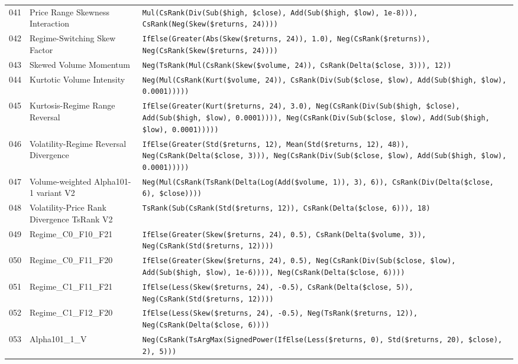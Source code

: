 \begin{longtable}{@{}llp{}@{}}
041 & Price Range Skewness Interaction & \texttt{Mul(CsRank(Div(Sub(\$high, \$close), Add(Sub(\$high, \$low), 1e-8))), CsRank(Neg(Skew(\$returns, 24))))} \\
042 & Regime-Switching Skew Factor & \texttt{IfElse(Greater(Abs(Skew(\$returns, 24)), 1.0), Neg(CsRank(\$returns)), Neg(CsRank(Skew(\$returns, 24))))} \\
043 & Skewed Volume Momentum & \texttt{Neg(TsRank(Mul(CsRank(Skew(\$volume, 24)), CsRank(Delta(\$close, 3))), 12))} \\
044 & Kurtotic Volume Intensity & \texttt{Neg(Mul(CsRank(Kurt(\$volume, 24)), CsRank(Div(Sub(\$close, \$low), Add(Sub(\$high, \$low), 0.0001)))))} \\
045 & Kurtosis-Regime Range Reversal & \texttt{IfElse(Greater(Kurt(\$returns, 24), 3.0), Neg(CsRank(Div(Sub(\$high, \$close), Add(Sub(\$high, \$low), 0.0001)))), Neg(CsRank(Div(Sub(\$close, \$low), Add(Sub(\$high, \$low), 0.0001)))))} \\
046 & Volatility-Regime Reversal Divergence & \texttt{IfElse(Greater(Std(\$returns, 12), Mean(Std(\$returns, 12), 48)), Neg(CsRank(Delta(\$close, 3))), Neg(CsRank(Div(Sub(\$close, \$low), Add(Sub(\$high, \$low), 0.0001)))))} \\
047 & Volume-weighted Alpha101-1 variant V2 & \texttt{Neg(Mul(CsRank(TsRank(Delta(Log(Add(\$volume, 1)), 3), 6)), CsRank(Div(Delta(\$close, 6), \$close))))} \\
048 & Volatility-Price Rank Divergence TsRank V2 & \texttt{TsRank(Sub(CsRank(Std(\$returns, 12)), CsRank(Delta(\$close, 6))), 18)} \\
049 & Regime\_C0\_F10\_F21 & \texttt{IfElse(Greater(Skew(\$returns, 24), 0.5), CsRank(Delta(\$volume, 3)), Neg(CsRank(Std(\$returns, 12))))} \\
050 & Regime\_C0\_F11\_F20 & \texttt{IfElse(Greater(Skew(\$returns, 24), 0.5), Neg(CsRank(Div(Sub(\$close, \$low), Add(Sub(\$high, \$low), 1e-6)))), Neg(CsRank(Delta(\$close, 6))))} \\
051 & Regime\_C1\_F11\_F21 & \texttt{IfElse(Less(Skew(\$returns, 24), -0.5), CsRank(Delta(\$close, 5)), Neg(CsRank(Std(\$returns, 12))))} \\
052 & Regime\_C1\_F12\_F20 & \texttt{IfElse(Less(Skew(\$returns, 24), -0.5), Neg(TsRank(\$returns, 12)), Neg(CsRank(Delta(\$close, 6))))} \\
053 & Alpha101\_1\_V & \texttt{Neg(CsRank(TsArgMax(SignedPower(IfElse(Less(\$returns, 0), Std(\$returns, 20), \$close), 2), 5)))} \\

\end{longtable}
